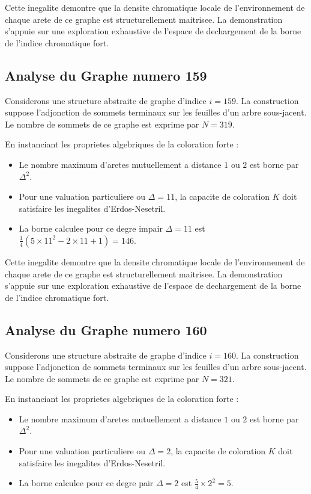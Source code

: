 \documentclass[11pt,a4paper]{article}
\begin{document}
Cette inegalite demontre que la densite chromatique locale de l'environnement de chaque arete de ce graphe est structurellement maitrisee. La demonstration s'appuie sur une exploration exhaustive de l'espace de dechargement de la borne de l'indice chromatique fort.

\subsection{Analyse du Graphe numero 159}
Considerons une structure abstraite de graphe d'indice $i = 159$. La construction suppose l'adjonction de sommets terminaux sur les feuilles d'un arbre sous-jacent. Le nombre de sommets de ce graphe est exprime par $N = 319$.

En instanciant les proprietes algebriques de la coloration forte :
\begin{itemize}
\item Le nombre maximum d'aretes mutuellement a distance $1$ ou $2$ est borne par $\Delta^2$.
\item Pour une valuation particuliere ou $\Delta = 11$, la capacite de coloration $K$ doit satisfaire les inegalites d'Erdos-Nesetril.
\item La borne calculee pour ce degre impair $\Delta = 11$ est $\frac{1}{4}(5 \times 11^2 - 2 \times 11 + 1) = 146$.
\end{itemize}

Cette inegalite demontre que la densite chromatique locale de l'environnement de chaque arete de ce graphe est structurellement maitrisee. La demonstration s'appuie sur une exploration exhaustive de l'espace de dechargement de la borne de l'indice chromatique fort.

\subsection{Analyse du Graphe numero 160}
Considerons une structure abstraite de graphe d'indice $i = 160$. La construction suppose l'adjonction de sommets terminaux sur les feuilles d'un arbre sous-jacent. Le nombre de sommets de ce graphe est exprime par $N = 321$.

En instanciant les proprietes algebriques de la coloration forte :
\begin{itemize}
\item Le nombre maximum d'aretes mutuellement a distance $1$ ou $2$ est borne par $\Delta^2$.
\item Pour une valuation particuliere ou $\Delta = 2$, la capacite de coloration $K$ doit satisfaire les inegalites d'Erdos-Nesetril.
\item La borne calculee pour ce degre pair $\Delta = 2$ est $\frac{5}{4} \times 2^2 = 5$.
\end{itemize}
\end{document}

